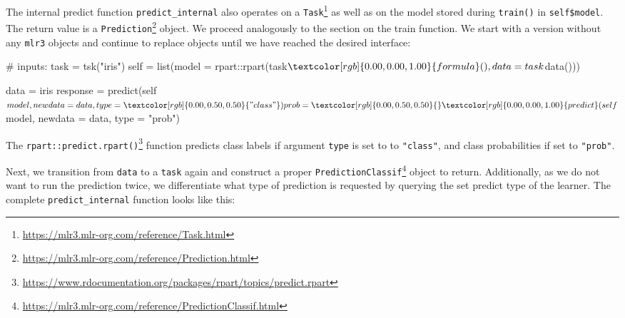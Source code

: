 \documentclass[12pt,]{scrbook}
\newenvironment{Shaded}{}{}
\newcommand{\CommentTok}[1]{\textcolor[rgb]{0.00,0.50,0.00}{#1}}
\newcommand{\DataTypeTok}[1]{#1}
\newcommand{\KeywordTok}[1]{\textcolor[rgb]{0.00,0.00,1.00}{#1}}
\newcommand{\NormalTok}[1]{#1}
\newcommand{\OperatorTok}[1]{#1}
\newcommand{\StringTok}[1]{\textcolor[rgb]{0.00,0.50,0.50}{#1}}
\renewcommand{\href}[2]{#2\footnote{\url{#1}}}
\begin{document}
The internal predict function \texttt{predict\_internal} also operates on a \href{https://mlr3.mlr-org.com/reference/Task.html}{\texttt{Task}} as well as on the model stored during \texttt{train()} in \texttt{self\$model}.
The return value is a \href{https://mlr3.mlr-org.com/reference/Prediction.html}{\texttt{Prediction}} object.
We proceed analogously to the section on the train function.
We start with a version without any \texttt{mlr3} objects and continue to replace objects until we have reached the desired interface:

\begin{Shaded}
\begin{Highlighting}[]
\CommentTok{# inputs:}
\NormalTok{task =}\StringTok{ }\KeywordTok{tsk}\NormalTok{(}\StringTok{"iris"}\NormalTok{)}
\NormalTok{self =}\StringTok{ }\KeywordTok{list}\NormalTok{(}\DataTypeTok{model =}\NormalTok{ rpart}\OperatorTok{::}\KeywordTok{rpart}\NormalTok{(task}\OperatorTok{$}\KeywordTok{formula}\NormalTok{(), }\DataTypeTok{data =}\NormalTok{ task}\OperatorTok{$}\KeywordTok{data}\NormalTok{()))}

\NormalTok{data =}\StringTok{ }\NormalTok{iris}
\NormalTok{response =}\StringTok{ }\KeywordTok{predict}\NormalTok{(self}\OperatorTok{$}\NormalTok{model, }\DataTypeTok{newdata =}\NormalTok{ data, }\DataTypeTok{type =} \StringTok{"class"}\NormalTok{)}
\NormalTok{prob =}\StringTok{ }\KeywordTok{predict}\NormalTok{(self}\OperatorTok{$}\NormalTok{model, }\DataTypeTok{newdata =}\NormalTok{ data, }\DataTypeTok{type =} \StringTok{"prob"}\NormalTok{)}
\end{Highlighting}
\end{Shaded}

The \href{https://www.rdocumentation.org/packages/rpart/topics/predict.rpart}{\texttt{rpart::predict.rpart()}} function predicts class labels if argument \texttt{type} is set to to \texttt{"class"}, and class probabilities if set to \texttt{"prob"}.

Next, we transition from \texttt{data} to a \texttt{task} again and construct a proper \href{https://mlr3.mlr-org.com/reference/PredictionClassif.html}{\texttt{PredictionClassif}} object to return.
Additionally, as we do not want to run the prediction twice, we differentiate what type of prediction is requested by querying the set predict type of the learner.
The complete \texttt{predict\_internal} function looks like this:
\end{document}
